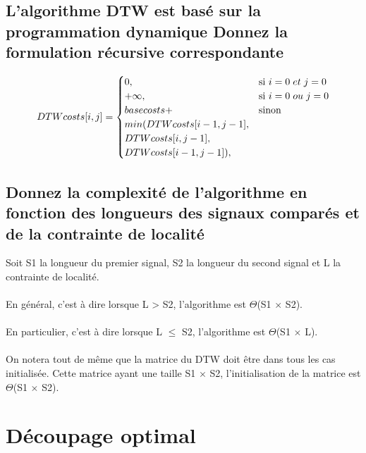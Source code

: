 \documentclass[a4paper,11pt]{article}
\begin{document}

\subsection{L'algorithme DTW est basé sur la programmation dynamique Donnez la formulation récursive correspondante}


  \begin{equation*}
    DTWcosts[i,j] =
    \begin{cases}
      0, & \text{si}\ i = 0 \hspace{0.1cm} et \hspace{0.1cm} j = 0 \\
      +\infty, & \text{si}\ i = 0 \hspace{0.1cm} ou \hspace{0.1cm} j = 0 \\
      basecosts +  & \text{sinon} \\ min(DTWcosts[i-1,j-1],\\DTWcosts[i,j-1],\\ DTWcosts[i-1,j-1]),
    \end{cases}
  \end{equation*}

\subsection{Donnez la complexité de l'algorithme en fonction des longueurs des signaux comparés et de la contrainte de localité}

Soit S1 la longueur du premier signal, S2 la longueur du second signal et L la contrainte de localité.
\\
\\
En général, c'est à dire lorsque L > S2, l'algorithme est $\Theta$(S1 $\times$ S2).
\\
\\
En particulier, c'est à dire lorsque L $\le$ S2, l'algorithme est $\Theta$(S1 $\times$ L).
\\
\\
On notera tout de même que la matrice du DTW doit être dans tous les cas initialisée. Cette matrice ayant une taille S1 $\times$ S2, l'initialisation de la matrice est $\Theta$(S1 $\times$ S2).

\section{Découpage optimal}
\end{document}

